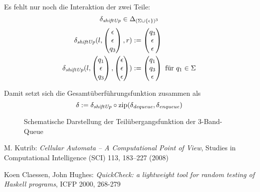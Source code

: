 \documentclass{article}
\DeclareMathOperator{\zip}{zip}
\begin{document}
Es fehlt nur noch die Interaktion der zwei Teile:
\[ \delta_\mathit{shiftUp} \in \Delta_{(\Sigma \cup \{\epsilon\})^3} \]
\begin{align*}
    \delta_\mathit{shiftUp}(l,\begin{pmatrix}\epsilon\\\epsilon\\q_3\end{pmatrix},r) &:= \begin{pmatrix}q_3\\\epsilon\\\epsilon\end{pmatrix} \\
    \delta_\mathit{shiftUp}(l,\begin{pmatrix}q_1\\\epsilon\\q_3\end{pmatrix},\begin{pmatrix}\epsilon\\\epsilon\\\epsilon\end{pmatrix}) &:= \begin{pmatrix}q_1\\q_3\\\epsilon\end{pmatrix} \text{ für } q_1 \in \Sigma
\end{align*}

Damit setzt sich die Gesamtüberführungsfunktion zusammen als
\[ \delta := \delta_\shiftUp \circ \zip(\delta_\dequeue,\delta_\enqueue) \]
\begin{figure}[h]
    \centering
    \caption{Schematische Darstellung der Teilübergangsfunktion der 3-Band-Queue}
\end{figure}

\newpage
\begin{thebibliography}{9}
        M. Kutrib: \emph{Cellular Automata – A Computational Point of View}, Studies in Computational Intelligence (SCI) 113, 183–227 (2008)

        Koen Claessen, John Hughes: \emph{QuickCheck: a lightweight tool for random testing of Haskell programs}, ICFP 2000, 268-279
\end{thebibliography}
\end{document}
